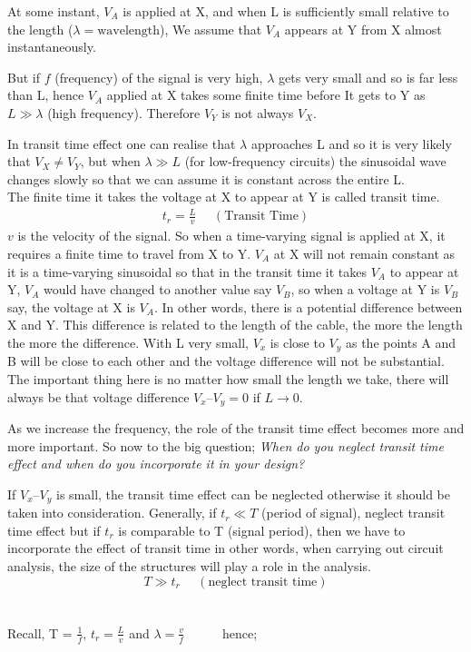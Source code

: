 At some instant, $ V_{A} $ is applied at X, and when L is sufficiently small relative to the length ($  \lambda = \text{wavelength} $), We assume that $ V_{A} $ appears at Y from X almost instantaneously.

But if $f$ (frequency) of the signal is very high, $\lambda $ gets very small and so is far less than L, hence  $  V_{A} $ applied at X takes some finite time before It gets to Y as $  L\gg \lambda $ (high frequency). Therefore $  V_{Y} $ is not always $  V_{X} $.

In transit time effect one can realise that $ \lambda $  approaches L and so it is very likely that $ V_{X} \neq V_{Y} $, but when $  \lambda \gg L  $ (for low-frequency circuits) the sinusoidal wave changes slowly so that we can assume it is constant across the entire L.\\
The finite time it takes the voltage at X to appear at Y is called transit time.
\begin{align}
 t_{r} = \frac{L}{v}\ \ \ \ \ \ (\text{Transit  Time})
\end{align}
$v$ is the velocity of the signal. So when a time-varying signal is applied at X, it requires a finite time to travel from X to Y.  $ V_{A} $  at X will not remain constant as it is a time-varying sinusoidal so that in the transit time it takes $ V_{A} $ to appear at Y, $ V_{A} $ would have changed to another value say $ V_{B} $, so when a voltage at Y is $ V_{B} $ say, the voltage at X is $ V_{A} $. In other words, there is a potential difference between X and Y. This difference is related to the length of the cable, the more the length the more the difference. With L very small, $ V_{x} $ is close to $ V_{y} $ as the points A and B will be close to each other and the voltage difference will not be substantial. The important thing here is no matter how small the length we take, there will always be that voltage difference $ V_{x} – V_{y} = 0 $ if $ L \rightarrow 0 $.

As we increase the frequency, the role of the transit time effect becomes more and more important. So now to the big question; \textit{When do you neglect transit time effect and when do you incorporate it in your design?}

If $ V_{x} – V_{y} $ is small, the transit time effect can be neglected otherwise it should be taken into consideration. Generally, if  $ t_{r} \ll T $ (period of signal), neglect transit time effect but if $ t_{r} $ is comparable to T (signal period), then we have to incorporate the effect of transit time in other words, when carrying out circuit analysis, the size of the structures will play a role in the analysis.
$$ T \gg t_{r}\ \ \ \ \ \ (\text{neglect transit time})$$\\\\
 Recall, T = $   \frac{1}{f}  $, $ t_{r} = \frac{L}{v} $ and $ \lambda = \frac{v}{f} $\ \ \ \ \ \ hence; 

